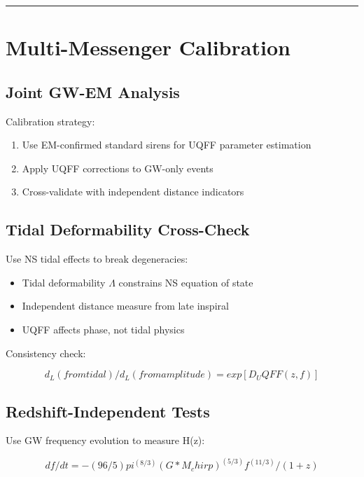\documentclass[12pt,a4paper]{article}
\begin{document}
\medskip\hrule\medskip

\section{Multi-Messenger Calibration}

\subsection{Joint GW-EM Analysis}

Calibration strategy:

\begin{enumerate}
  \item Use EM-confirmed standard sirens for UQFF parameter estimation
  \item Apply UQFF corrections to GW-only events
  \item Cross-validate with independent distance indicators
\end{enumerate}

\subsection{Tidal Deformability Cross-Check}

Use NS tidal effects to break degeneracies:

\begin{itemize}
  \item Tidal deformability $\Lambda$ constrains NS equation of state
  \item Independent distance measure from late inspiral
  \item UQFF affects phase, not tidal physics
\end{itemize}

Consistency check:

\begin{equation}
d_L(from tidal) / d_L(from amplitude) = exp[D_UQFF(z,f)]
\end{equation}

\subsection{Redshift-Independent Tests}

Use GW frequency evolution to measure H(z):

\begin{equation}
df/dt = -(96/5)pi^(8/3) (G*M_chirp)^(5/3) f^(11/3) / (1+z)
\end{equation}
\end{document}
